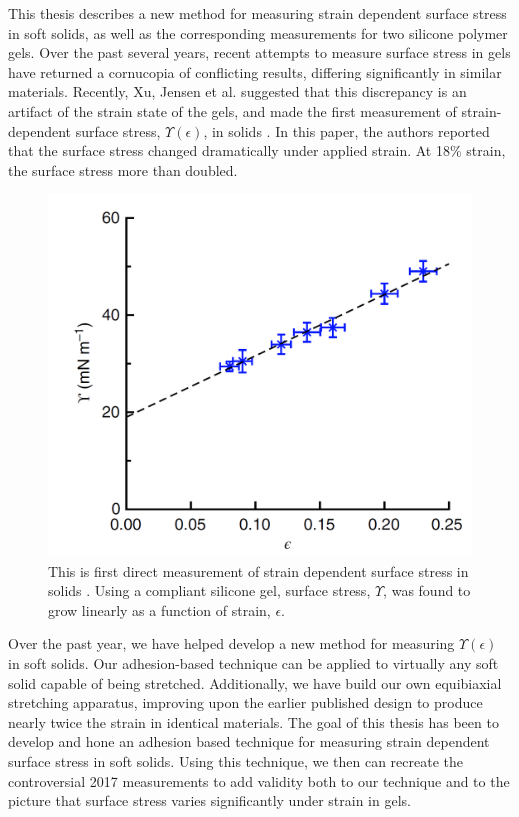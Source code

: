 This thesis describes a new method for measuring strain dependent surface stress in soft solids, as well as the corresponding measurements for two silicone polymer gels. Over the past several years, recent attempts to measure surface stress in gels have returned a cornucopia of conflicting results, differing significantly in similar materials. Recently, Xu, Jensen et al. suggested that this discrepancy is an artifact of the strain state of the gels, and made the first measurement of strain-dependent surface stress, $\Upsilon(\epsilon)$, in solids \cite{xu2017direct}. In this paper, the authors reported that the surface stress changed dramatically under applied strain. At 18\% strain, the surface stress more than doubled. 
\begin{figure}[h!]
	\centering
	\includegraphics[width=0.7\linewidth]{Chapters/Figures/2017natcomfig}
	\caption[Surface Stress vs. Strain in Silicone]{This is first direct measurement of strain dependent surface stress in solids \cite{xu2017direct}. Using a compliant silicone gel, surface stress, $\Upsilon$, was found to grow linearly as a function of strain, $ \epsilon $.}
	\label{fig:2017natcomfig}
\end{figure}

Over the past year, we have helped develop a new method for measuring $\Upsilon(\epsilon)$ in soft solids. Our adhesion-based technique can be applied to virtually any soft solid capable of being stretched. Additionally, we have build our own equibiaxial stretching apparatus, improving upon the earlier published design \cite{xu2017direct} to produce nearly twice the strain in identical materials. The goal of this thesis has been to develop and hone an adhesion based technique for measuring strain dependent surface stress in soft solids. Using this technique, we then can recreate the controversial 2017 measurements to add validity both to our technique and to the picture that surface stress varies significantly under strain in gels.

